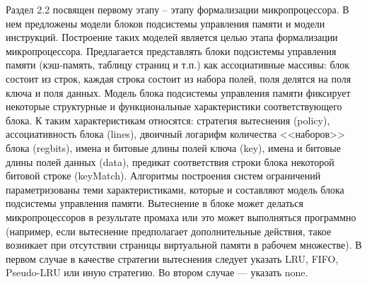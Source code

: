 \documentclass[14pt,autoref,href
,facsimile
]{disser}
\begin{document}
Раздел 2.2 посвящен первому этапу -- этапу формализации микропроцессора. В нем предложены модели блоков подсистемы управления памяти и модели инструкций. Построение таких моделей является целью этапа формализации микропроцессора. Предлагается представлять блоки подсистемы управления памяти (кэш-память, таблицу страниц и т.п.) как ассоциативные массивы: блок состоит из строк, каждая строка состоит из набора полей, поля делятся на поля ключа и поля данных. Модель блока подсистемы управления памяти фиксирует некоторые структурные и функциональные характеристики соответствующего блока. К таким характеристикам относятся: стратегия вытеснения (policy), ассоциативность блока (lines), двоичный логарифм количества <<наборов>> блока (regbits), имена и битовые длины полей ключа (key), имена и битовые длины полей данных (data), предикат соответствия строки блока некоторой битовой строке (keyMatch). Алгоритмы построения систем ограничений параметризованы теми характеристиками, которые и составляют модель блока подсистемы управления памяти. Вытеснение в блоке может делаться микропроцессоров в результате промаха или это может выполняться программно (например, если вытеснение предполагает дополнительные действия, такое возникает при отсутствии страницы виртуальной памяти в рабочем множестве). В первом случае в качестве стратегии вытеснения следует указать LRU, FIFO, Pseudo-LRU или иную стратегию. Во втором случае --- указать none.
\end{document}

